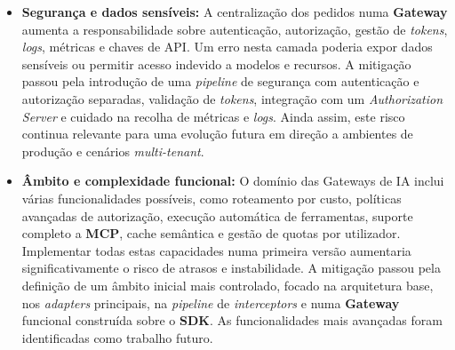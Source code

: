 \begin{itemize}
        \item \textbf{Segurança e dados sensíveis:}
        A centralização dos pedidos numa \textbf{Gateway} aumenta a responsabilidade sobre autenticação, autorização, gestão de \textit{tokens}, \textit{logs}, métricas e chaves de API. Um erro nesta camada poderia expor dados sensíveis ou permitir acesso indevido a modelos e recursos.
        A mitigação passou pela introdução de uma \textit{pipeline} de segurança com autenticação e autorização separadas, validação de \textit{tokens}, integração com um \textit{Authorization Server} e cuidado na recolha de métricas e \textit{logs}. Ainda assim, este risco continua relevante para uma evolução futura em direção a ambientes de produção e cenários \textit{multi-tenant}.

        \item \textbf{Âmbito e complexidade funcional:}
        O domínio das Gateways de IA inclui várias funcionalidades possíveis, como roteamento por custo, políticas avançadas de autorização, execução automática de ferramentas, suporte completo a \textbf{MCP}, cache semântica e gestão de quotas por utilizador. Implementar todas estas capacidades numa primeira versão aumentaria significativamente o risco de atrasos e instabilidade.
        A mitigação passou pela definição de um âmbito inicial mais controlado, focado na arquitetura base, nos \textit{adapters} principais, na \textit{pipeline} de \textit{interceptors} e numa \textbf{Gateway} funcional construída sobre o \textbf{SDK}. As funcionalidades mais avançadas foram identificadas como trabalho futuro.
    \end{itemize}

